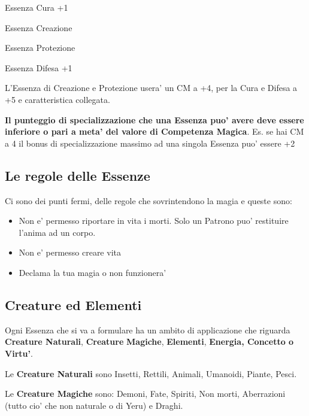 \documentclass[a4paper,11pt,twoside,openany]{book}
\begin{document}
Essenza Cura +1

Essenza Creazione

Essenza Protezione

Essenza Difesa +1

L'Essenza di Creazione e Protezione usera' un CM a +4, per la Cura e Difesa a +5 e caratteristica collegata.

\bigskip

\textbf{Il punteggio di specializzazione che una Essenza puo' avere deve essere inferiore o pari a meta' del valore di Competenza Magica}. Es. se hai CM a 4 il bonus di specializzazione massimo ad una singola Essenza puo' essere +2

\subsection{Le regole delle Essenze}

\label{le-regole-delle-essenze}

Ci sono dei punti fermi, delle regole che sovrintendono la magia e queste sono:
\begin{itemize}
\item Non e' permesso riportare in vita i morti. Solo un Patrono puo' restituire l'anima ad un corpo. 

\item Non e' permesso creare vita 

\item Declama la tua magia o non funzionera' 

\end{itemize}

\subsection{Creature ed Elementi}

\label{creature-ed-elementi}

Ogni Essenza che si va a formulare ha un ambito di applicazione che riguarda \textbf{Creature Naturali}, \textbf{Creature} \textbf{Magiche},
\textbf{Elementi}, \textbf{Energia, Concetto o Virtu'}.
\bigskip

Le \textbf{Creature Naturali} sono Insetti, Rettili, Animali, Umanoidi, Piante, Pesci.

Le \textbf{Creature Magiche} sono: Demoni, Fate, Spiriti, Non morti, Aberrazioni (tutto cio' che non naturale o di Yeru) e Draghi.
\end{document}
